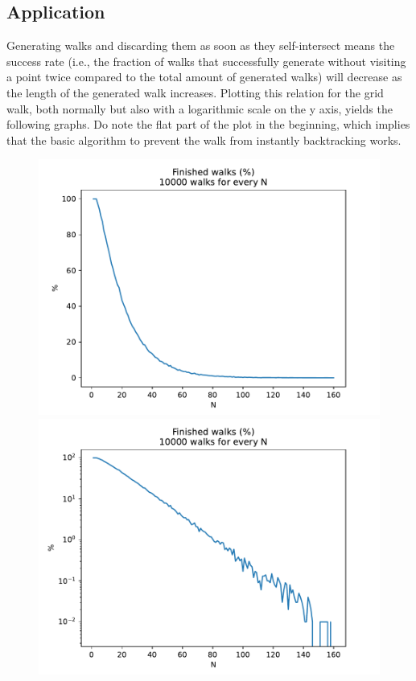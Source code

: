 \documentclass[a4paper,12pt]{article}
\begin{document}
\subsection*{Application}

Generating walks and discarding them as soon as they self-intersect means the success rate (i.e., the fraction of
walks that successfully generate without visiting a point twice compared to the total amount of generated walks)
will decrease as the length of the generated walk increases. Plotting this relation for the grid walk, both normally
but also with a logarithmic scale on the y axis, yields the following graphs. Do note the flat part of the plot in
the beginning, which implies that the basic algorithm to prevent the walk from instantly backtracking works.

\begin{figure}[!ht]
  \centering
  \begin{minipage}{0.49\textwidth}
    \includegraphics[width=\textwidth]{img/3-grid-fraction-finished.pdf}
  \end{minipage}
  \begin{minipage}{0.49\textwidth}
    \includegraphics[width=\textwidth]{img/3-grid-fraction-finished-log.pdf}
  \end{minipage}
\end{figure}
\end{document}
